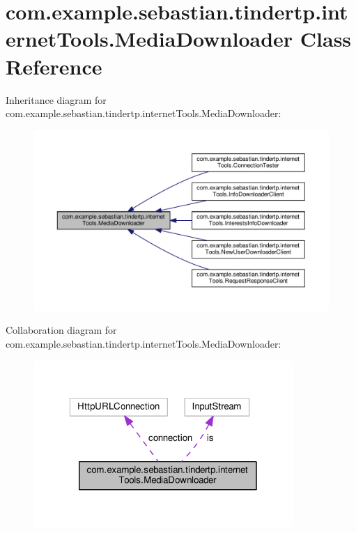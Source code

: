 \hypertarget{classcom_1_1example_1_1sebastian_1_1tindertp_1_1internetTools_1_1MediaDownloader}{}\section{com.\+example.\+sebastian.\+tindertp.\+internet\+Tools.\+Media\+Downloader Class Reference}
\label{classcom_1_1example_1_1sebastian_1_1tindertp_1_1internetTools_1_1MediaDownloader}


Inheritance diagram for com.\+example.\+sebastian.\+tindertp.\+internet\+Tools.\+Media\+Downloader\+:\nopagebreak
\begin{figure}[H]
\begin{center}
\leavevmode
\includegraphics[width=350pt]{classcom_1_1example_1_1sebastian_1_1tindertp_1_1internetTools_1_1MediaDownloader__inherit__graph}
\end{center}
\end{figure}


Collaboration diagram for com.\+example.\+sebastian.\+tindertp.\+internet\+Tools.\+Media\+Downloader\+:\nopagebreak
\begin{figure}[H]
\begin{center}
\leavevmode
\includegraphics[width=280pt]{classcom_1_1example_1_1sebastian_1_1tindertp_1_1internetTools_1_1MediaDownloader__coll__graph}
\end{center}
\end{figure}
